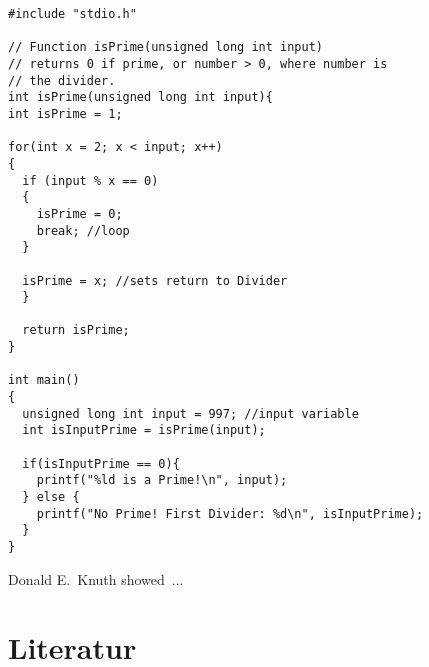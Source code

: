 \documentclass[a4paper,12pt,ngerman,oneside]{article}
\begin{document}
  \belowcaptionskip=-10pt
  \begin{lstlisting}[label=example1,caption=Primefinder in C with 997 as Testnumber, basicstyle=\small]
#include "stdio.h"

// Function isPrime(unsigned long int input)
// returns 0 if prime, or number > 0, where number is 
// the divider.
int isPrime(unsigned long int input){
int isPrime = 1;

for(int x = 2; x < input; x++)
{
  if (input % x == 0)
  {
	isPrime = 0;
	break; //loop
  }
  
  isPrime = x; //sets return to Divider
  }
  
  return isPrime;
}

int main()
{
  unsigned long int input = 997; //input variable
  int isInputPrime = isPrime(input);

  if(isInputPrime == 0){
	printf("%ld is a Prime!\n", input);
  } else {
	printf("No Prime! First Divider: %d\n", isInputPrime);
  }
}
  \end{lstlisting}
  

  
  Donald E.~Knuth  showed~\cite{artof}...
  
  
  \newpage
  \section{Literatur}
  
\end{document}
